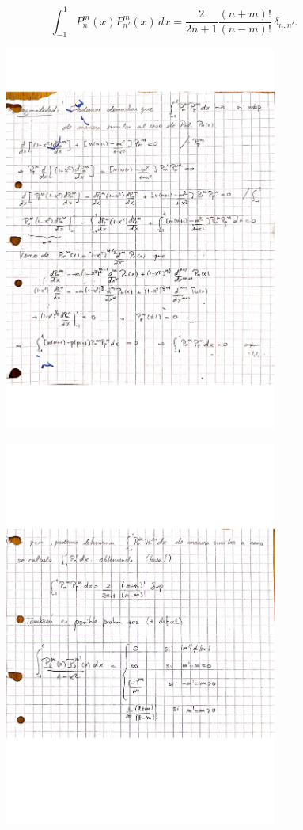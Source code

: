 \begin{equation}
\int_{-1}^{1}P_{n}^m(x)P_{n'}^m(x)\,dx=\frac{2}{2n+1}\frac{(n+m)!}{(n-m)!}\,\delta_{n,n'}.
\end{equation}
\begin{figure}[H]
\centering
\includegraphics[angle=0,width=0.8\textwidth]{figs/FM2-01_1.pdf}
\end{figure}
\begin{figure}[H]
\centering
\includegraphics[angle=0,width=0.8\textwidth]{figs/FM2-01_2.pdf}
\end{figure}


